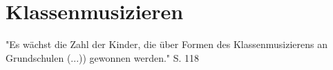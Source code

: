 \section{Klassenmusizieren}


"Es wächst die Zahl der Kinder, die über Formen des Klassenmusizierens an
Grundschulen (...)) gewonnen werden." S. 118 
